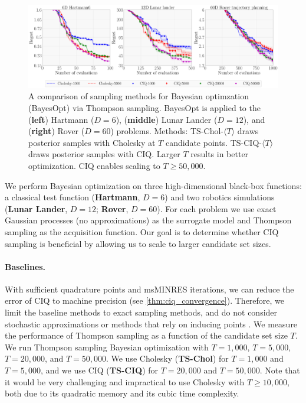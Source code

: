 \begin{figure}[t!]
  \centering
  \includegraphics[width=0.97\linewidth]{figures/bo_ciq.pdf}
  \caption[
    A comparison of sampling methods for Bayesian optimzation (BayesOpt) via Thompson sampling.
    BayesOpt is applied to the Hartmann ($D=6$) and Lunar Lander ($D=12$) functions.
  ]{
    A comparison of sampling methods for Bayesian optimzation (BayesOpt) via Thompson sampling.
    BayesOpt is applied to the ({\bf left}) Hartmann ($D=6$), ({\bf middle}) Lunar Lander ($D=12$), and ({\bf right}) Rover ($D=60$) problems.
    Methods: TS-Chol-$\langle T \rangle$ draws posterior samples with Cholesky at $T$ candidate points.
    TS-CIQ-$\langle T \rangle$ draws posterior samples with CIQ.
    Larger $T$ results in better optimization.
    CIQ enables scaling to $T\geq50,\!000$.
  }
  \label{fig:bayesopt}
\end{figure}

We perform Bayesian optimization on three high-dimensional black-box functions: a classical test function ({\bf Hartmann}, $D=6$) and two robotics simulations ({\bf Lunar Lander}, $D=12$; {\bf Rover}, $D=60$).
For each problem we use exact Gaussian processes (no approximations) as the surrogate model and Thompson sampling as the acquisition function.
Our goal is to determine whether CIQ sampling is beneficial by allowing us to scale to larger candidate set sizes.

\paragraph{Baselines.}
With sufficient quadrature points and msMINRES iterations, we can reduce the error of CIQ to machine precision (see \cref{thm:ciq_convergence}). Therefore,
we limit the baseline methods to exact sampling methods, and do not consider stochastic approximations \cite{rahimi2008random} or methods that rely on inducing points \cite{wilson2020efficiently}.
We measure the performance of Thompson sampling as a function of the candidate set size $T$.
We run Thompson sampling Bayesian optimization with $T=1,\!000$, $T=5,\!000$, $T=20,\!000$, and $T=50,\!000$.
We use Cholesky ({\bf TS-Chol}) for $T=1,\!000$ and $T=5,\!000$, and we use CIQ ({\bf TS-CIQ}) for $T=20,\!000$ and $T=50,\!000$.
Note that it would be very challenging and impractical to use Cholesky with $T\geq10,\!000$, both due to its quadratic memory and its cubic time complexity.

